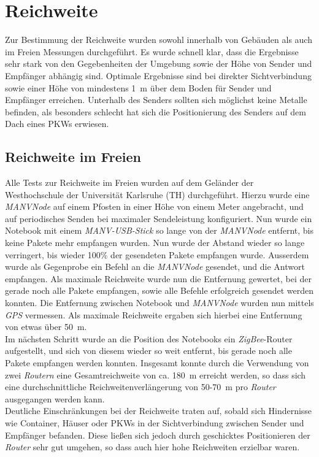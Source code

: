 \section{Reichweite}
Zur Bestimmung der Reichweite wurden sowohl innerhalb von Gebäuden als auch im Freien Messungen durchgeführt. 
Es wurde schnell klar, dass die Ergebnisse sehr stark von den Gegebenheiten der Umgebung sowie der Höhe von
Sender und Empfänger abhängig sind. Optimale Ergebnisse sind bei direkter Sichtverbindung
sowie einer Höhe von mindestens 1~m über dem Boden für Sender und Empfänger erreichen. 
Unterhalb des Senders sollten sich möglichst keine Metalle befinden, als besonders schlecht hat sich die 
Positionierung des Senders auf dem Dach eines PKWs erwiesen. 

\subsection{Reichweite im Freien}
Alle Tests zur Reichweite im Freien wurden auf dem Geländer der Westhochschule der Universität Karlsruhe (TH)
durchgeführt. Hierzu wurde eine \emph{MANVNode} auf einem Pfosten in einer Höhe von einem Meter angebracht,
und auf periodisches Senden bei maximaler Sendeleistung konfiguriert.  Nun wurde ein Notebook mit einem 
\emph{MANV-USB-Stick} so lange von der \emph{MANVNode} entfernt, bis keine Pakete mehr empfangen wurden.
Nun wurde der Abstand wieder so lange verringert, bis wieder 100\% der gesendeten Pakete empfangen wurde.
Ausserdem wurde als Gegenprobe ein Befehl an die \emph{MANVNode} gesendet, und die Antwort empfangen. 
Als maximale Reichweite wurde nun die Entfernung gewertet, bei der gerade noch alle Pakete empfangen, 
sowie alle Befehle erfolgreich gesendet werden konnten. Die Entfernung zwischen Notebook und 
\emph{MANVNode} wurden nun mittels \emph{GPS} vermessen. Als maximale Reichweite ergaben sich hierbei eine Entfernung
von etwas über 50~m.\\
Im nächsten Schritt wurde an die Position des Notebooks ein \emph{ZigBee}-Router aufgestellt, und sich von
diesem wieder so weit entfernt, bis gerade noch alle Pakete empfangen werden konnten. Insgesamt konnte durch
die Verwendung von zwei \emph{Routern} eine Gesamtreichweite von ca. 180~m erreicht werden, so dass sich eine 
durchschnittliche Reichweitenverlängerung von 50-70~m pro \emph{Router} ausgegangen werden kann.\\
Deutliche Einschränkungen bei der Reichweite traten auf, sobald sich Hindernisse wie Container, Häuser oder 
PKWs in der Sichtverbindung zwischen Sender und Empfänger befanden. Diese ließen sich jedoch durch geschicktes
Positionieren der \emph{Router} sehr gut umgehen, so dass auch hier hohe Reichweiten erzielbar waren. 


